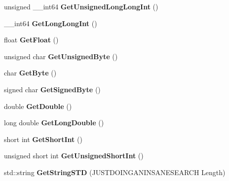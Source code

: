 \begin{DoxyCompactItemize}
\item 
\hypertarget{classcl_packet_a0bc27685573ab327465bdfd5abab62b3}{
unsigned \_\-\_\-int64 {\bfseries GetUnsignedLongLongInt} ()}
\label{classcl_packet_a0bc27685573ab327465bdfd5abab62b3}

\item 
\hypertarget{classcl_packet_a27cf46542c95bded785b44118a364a16}{
\_\-\_\-int64 {\bfseries GetLongLongInt} ()}
\label{classcl_packet_a27cf46542c95bded785b44118a364a16}

\item 
\hypertarget{classcl_packet_a4dbc0eeff7efb734115ff95d81683fa6}{
float {\bfseries GetFloat} ()}
\label{classcl_packet_a4dbc0eeff7efb734115ff95d81683fa6}

\item 
\hypertarget{classcl_packet_a8a96feab4f7aa4bd2695ce1e211c7383}{
unsigned char {\bfseries GetUnsignedByte} ()}
\label{classcl_packet_a8a96feab4f7aa4bd2695ce1e211c7383}

\item 
\hypertarget{classcl_packet_ade11951433eeccbaece1cc9b20a21f9d}{
char {\bfseries GetByte} ()}
\label{classcl_packet_ade11951433eeccbaece1cc9b20a21f9d}

\item 
\hypertarget{classcl_packet_a9b66f00ea3655687093b89ba719490e6}{
signed char {\bfseries GetSignedByte} ()}
\label{classcl_packet_a9b66f00ea3655687093b89ba719490e6}

\item 
\hypertarget{classcl_packet_a5bcd7577256b98f209785428d96ab785}{
double {\bfseries GetDouble} ()}
\label{classcl_packet_a5bcd7577256b98f209785428d96ab785}

\item 
\hypertarget{classcl_packet_a436a9f6d1c2ada1ff3f7002ce5f6d5ef}{
long double {\bfseries GetLongDouble} ()}
\label{classcl_packet_a436a9f6d1c2ada1ff3f7002ce5f6d5ef}

\item 
\hypertarget{classcl_packet_ac052e22b5b281fc136c8ffc54bfb9fab}{
short int {\bfseries GetShortInt} ()}
\label{classcl_packet_ac052e22b5b281fc136c8ffc54bfb9fab}

\item 
\hypertarget{classcl_packet_a399d815535e8b7841cab25ffb3fb8639}{
unsigned short int {\bfseries GetUnsignedShortInt} ()}
\label{classcl_packet_a399d815535e8b7841cab25ffb3fb8639}

\item 
\hypertarget{classcl_packet_a796508dc773d6d0a707ec3263238c55e}{
std::string {\bfseries GetStringSTD} (JUSTDOINGANINSANESEARCH Length)}
\label{classcl_packet_a796508dc773d6d0a707ec3263238c55e}


\end{DoxyCompactItemize}
